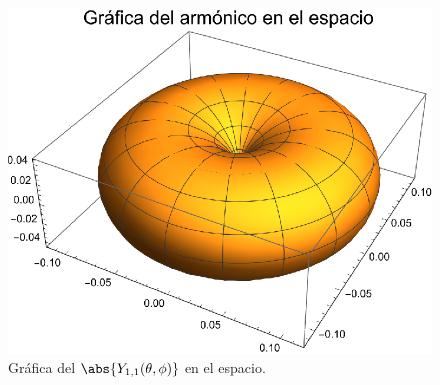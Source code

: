 \begin{figure}[H]
    \centering
    \includegraphics[scale=1]{Imagenes/Plot_Y11_02.eps}
    \caption{Gráfica del $\abs{Y_{1, 1} (\theta, \phi)}$ en el espacio.}
    \label{fig:figura_plot_Y11_02}
\end{figure}

